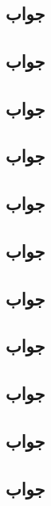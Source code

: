\documentclass[]{exam}
\begin{document}

\\
\subsection*{جواب}




\subsection*{جواب}



\subsection*{جواب}



\subsection*{جواب}



\subsection*{جواب}



\subsection*{جواب}



\subsection*{جواب}



\subsection*{جواب}


\pagebreak

\subsection*{جواب}



\subsection*{جواب}


\pagebreak

\subsection*{جواب}

\end{document}
